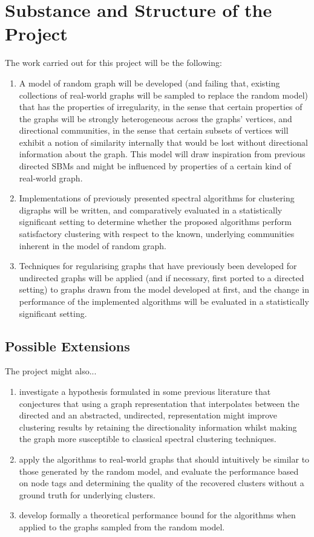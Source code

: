 \documentclass[a4paper,12pt]{article}
\begin{document}
\section*{Substance and Structure of the Project}
	The work carried out for this project will be the following:
	\begin{enumerate}
		\item A model of random graph will be developed
		(and failing that, existing collections of real-world graphs will be sampled to 
		replace the random model) that has the properties of 
		irregularity, in the sense that certain properties of the graphs will be strongly 
		heterogeneous across the graphs' vertices, and directional communities, in the sense that 
		certain subsets of vertices will exhibit a notion of similarity internally that 
		would be lost without directional information about the graph. This model will 
		draw inspiration from previous directed SBMs and might be influenced by properties 
		of a certain kind of real-world graph.
		\item Implementations of previously presented spectral algorithms for clustering 
		digraphs will be written, and comparatively evaluated in a statistically 
		significant setting to determine whether the proposed algorithms perform 
		satisfactory clustering with respect to the known, underlying communities inherent 
		in the model of random graph.
		\item Techniques for regularising graphs that have previously been developed for 
		undirected graphs will be applied (and if necessary, first ported to a directed 
		setting) to graphs drawn from the model developed at first, and the change in 
		performance of the implemented algorithms will be evaluated in a statistically 
		significant setting.
	\end{enumerate}

	\subsection*{Possible Extensions}
	The project might also...
	\begin{enumerate}[...]
		\item investigate a hypothesis formulated in some previous literature that 
		conjectures that using a graph representation that interpolates between the 
		directed and an abstracted, undirected, representation might improve clustering 
		results by retaining the directionality information whilst making the graph more 
		susceptible to classical spectral clustering techniques.
		\item apply the algorithms to real-world graphs that should intuitively be similar 
		to those generated by the random model, and evaluate the performance based on node 
		tags and determining the quality of the recovered clusters without a ground truth 
		for underlying clusters.
		\item develop formally a theoretical performance bound for the algorithms when 
		applied to the graphs sampled from the random model.
	\end{enumerate}
\end{document}
